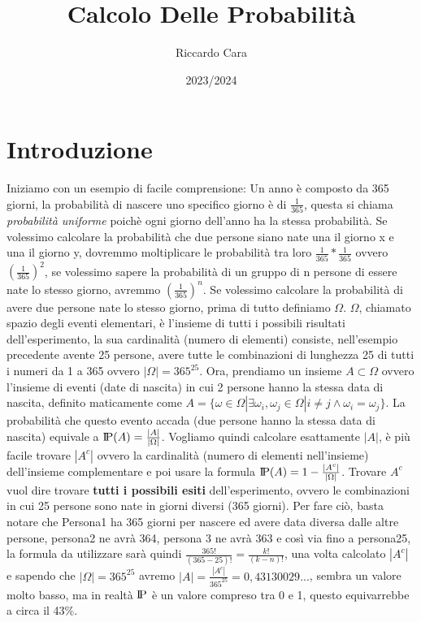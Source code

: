 \documentclass{article}
\title{Calcolo Delle Probabilità}
\author{Riccardo Cara}
\date{2023/2024}
\newcommand{\probP}{\text{I\kern-0.15em P}}
\begin{document}
\maketitle
\tableofcontents
\newpage
\section{Introduzione}
Iniziamo con un esempio di facile comprensione:
Un anno è composto da 365 giorni, la probabilità di nascere uno specifico giorno è di $\frac{1}{365}$, questa si chiama \textit{probabilità uniforme} poichè ogni giorno dell'anno ha la stessa probabilità.
Se volessimo calcolare la probabilità che due persone siano nate una il giorno x e una il giorno y, dovremmo moltiplicare le probabilità tra loro $\frac{1}{365}*\frac{1}{365}$ ovvero $(\frac{1}{365})^2$, se volessimo sapere la probabilità di un gruppo di n persone di essere nate lo stesso giorno, avremmo $(\frac{1}{365})^n$.
Se volessimo calcolare la probabilità di avere due persone nate lo stesso giorno, prima di tutto definiamo $\Omega$.
$\Omega$, chiamato spazio degli eventi elementari, è l'insieme di tutti i possibili risultati dell'esperimento, la sua cardinalità (numero di elementi) consiste, nell'esempio precedente avente 25 persone, avere tutte le combinazioni di lunghezza 25 di tutti i numeri da 1 a 365 ovvero $|\Omega| = 365^{25}$.
Ora, prendiamo un insieme $A \subset \Omega$ ovvero l'insieme di eventi (date di nascita) in cui 2 persone hanno la stessa data di nascita, definito maticamente come $A=\{\omega \in \Omega |\exists \omega_i,\omega_j \in \Omega | i\neq j\land \omega_i = \omega_j\}$. La probabilità che questo evento accada (due persone hanno la stessa data di nascita) equivale a $\probP(A)=\frac{|A|}{|\Omega|}$.
Vogliamo quindi calcolare esattamente $|A|$, è più facile trovare $|A^c|$ ovvero la cardinalità (numero di elementi nell'insieme) dell'insieme complementare e poi usare la formula $\probP(A)=1-\frac{|A^c|}{|\Omega|}$.
Trovare $A^c$ vuol dire trovare \textbf{tutti i possibili esiti} dell'esperimento, ovvero le combinazioni in cui 25 persone sono nate in giorni diversi (365 giorni). Per fare ciò, basta notare che Persona1 ha 365 giorni per nascere ed avere data diversa dalle altre persone, persona2 ne avrà 364, persona 3 ne avrà 363 e così via fino a persona25, la formula da utilizzare sarà quindi $\frac{365!}{(365-25)!}=\frac{k!}{(k-n)!}$, una volta calcolato $|A^c|$ e sapendo che $|\Omega|=365^{25}$ avremo $|A|=\frac{|A^c|}{365^{25}} =0,43130029...$, sembra un valore molto basso, ma in realtà $\probP$ è un valore compreso tra 0 e 1, questo equivarrebbe a circa il 43\%.
\end{document}
